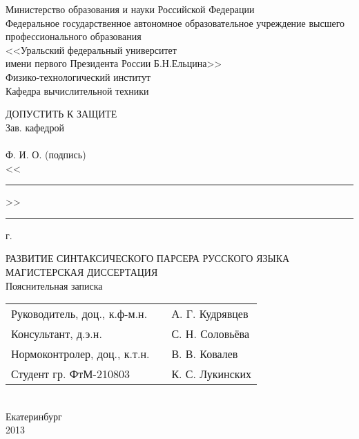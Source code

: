 \thispagestyle{empty}
\begin{center}
Министерство образования и науки  Российской Федерации\\
Федеральное государственное автономное образовательное учреждение 
высшего профессионального образования\\
<<Уральский  федеральный университет\\ имени первого Президента России Б.Н.Ельцина>>\\
Физико-технологический институт\\
Кафедра вычислительной техники\\
\end{center}

\vspace{1cm}

\begin{flushright}
		\begin{minipage}{0.50\textwidth}
			\begin{flushleft}
				ДОПУСТИТЬ К ЗАЩИТЕ\\
				Зав. кафедрой \hrulefill\\
				\hrulefill \space \hrulefill\\
				{\small Ф. И. О.} \hspace{3cm} {\small (подпись)}\\
				<<\rule{1.5cm}{0.2mm}>> \hrulefill {}\rule{1cm}{0.2mm} г.\\
			\end{flushleft}
		\end{minipage}
\end{flushright}

\vspace{1cm}

\begin{center}
{\large РАЗВИТИЕ СИНТАКСИЧЕСКОГО ПАРСЕРА РУССКОГО ЯЗЫКА}\\
\vspace{1cm}
МАГИСТЕРСКАЯ ДИССЕРТАЦИЯ\\
Пояснительная записка\\
\vspace{3cm}
	\begin{tabular}{ l c l}
		Руководитель, доц., к.ф-м.н. & \HRule & А. Г. Кудрявцев\\
		Консультант, д.э.н. & \HRule & С. Н. Соловьёва\\
		Нормоконтролер, доц., к.т.н. & \HRule & В. В. Ковалев\\
		Студент гр. ФтМ-210803 & \HRule & К. С. Лукинских\\		
	\end{tabular}\\
\vspace{3cm}
Екатеринбург\\
2013
\end{center}
